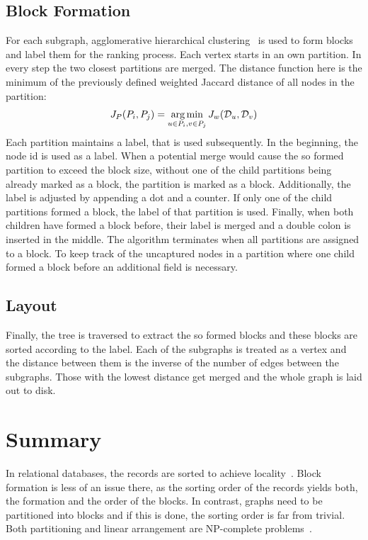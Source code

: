     \subsection*{Block Formation}
    For each subgraph, agglomerative hierarchical clustering~\autocite{hac} is used to form blocks and label them for the ranking process.
    Each vertex starts in an own partition. 
    In every step the two closest partitions are merged. 
    The distance function here is the minimum of the previously defined weighted Jaccard distance of all nodes in the partition:
    \[ J_P (P_i, P_j) = \operatorname*{arg\,min}_{u \in P_i, v \in P_j} J_w (\mathcal{D}_u, \mathcal{D}_v) \]
    Each partition maintains a label, that is used subsequently.
    In the beginning, the node id is used as a label. 
    When a potential merge would cause the so formed partition to exceed the block size, without one of the child partitions being already marked as a block, the partition is marked as a block.
    Additionally, the label is adjusted by appending a dot and a counter.
    If only one of the child partitions formed a block, the label of that partition is used.
    Finally, when both children have formed a block before, their label is merged and a double colon is inserted in the middle.
    The algorithm terminates when all partitions are assigned to a block.
    To keep track of the uncaptured nodes in a partition where one child formed a block before an additional field is necessary.    
    
    
    \subsection*{Layout}
    Finally, the tree is traversed to extract the so formed blocks and these blocks are sorted according to the label. 
    Each of the subgraphs is treated as a vertex and the distance between them is the inverse of the number of edges between the subgraphs. Those with the lowest distance get merged and the whole graph is laid out to disk.
    


\section*{Summary}
    In relational databases, the records are sorted to achieve locality~\autocite{ramakrishnan2000database, silberschatz1997database}. 
    Block formation is less of an issue there, as the sorting order of the records yields both, the formation and the order of the blocks.
    In contrast, graphs need to be partitioned into blocks and if this is done, the sorting order is far from trivial.
    Both partitioning and linear arrangement are NP-complete problems~\autocite{lewis1983computers}.
    
